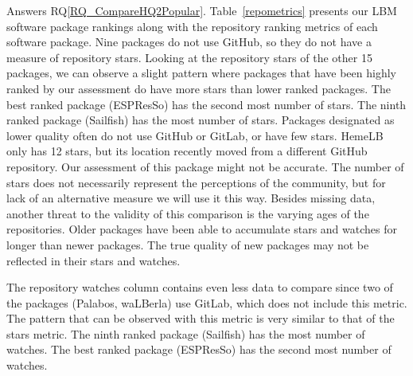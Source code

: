 \documentclass[final, 3p, times, authoryear]{elsarticle}
\newcommand{\rqref}[1]{RQ\ref{#1}}
\begin{document}
Answers \rqref{RQ_CompareHQ2Popular}. Table~\ref{repometrics} presents our LBM
software package rankings along with the repository ranking metrics of each
software package. Nine packages do not use GitHub, so they do not have a measure
of repository stars. Looking at the repository stars of the other 15 packages,
we can observe a slight pattern where packages that have been highly ranked by
our assessment do have more stars than lower ranked packages. The best ranked
package (ESPResSo) has the second most number of stars. The ninth ranked package
(Sailfish) has the most number of stars. Packages designated as lower quality
often do not use GitHub or GitLab, or have few stars. HemeLB only has 12 stars,
but its location recently moved from a different GitHub repository. Our
assessment of this package might not be accurate. The number of stars does not
necessarily represent the perceptions of the community, but for lack of an
alternative measure we will use it this way. Besides missing data, another
threat to the validity of this comparison is the varying ages of the
repositories. Older packages have been able to accumulate stars and watches for
longer than newer packages. The true quality of new packages may not be
reflected in their stars and watches.

The repository watches column contains even less data to compare since two of
the packages (Palabos, waLBerla) use GitLab, which does not include this metric.
The pattern that can be observed with this metric is very similar to that of the
stars metric. The ninth ranked package (Sailfish) has the most number of
watches. The best ranked package (ESPResSo) has the second most number of
watches.
\end{document}
